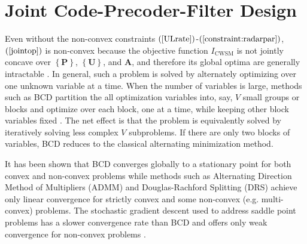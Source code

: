 \documentclass[10pt,journal]{IEEEtran}
\newcommand{\paren}[1]{\left({#1}\right)}
\newcommand{\braces}[1]{{\left\{ {#1}\right\}}}
\theoremstyle{definition}
\begin{document}
\section{Joint Code-Precoder-Filter Design}
\label{sec:solution}
Even without the non-convex constraints $\paren{\mathrm{\ref{ULrate}}}$-$\paren{\mathrm{\ref{constraint:radarpar}}}$, $\paren{\mathrm{\ref{jointop}}}$ is non-convex because the objective function $\mathit{I}_{\textrm{CWSM}}$ is not jointly concave over ${\braces{\mathbf{P}}}$, $\braces{\mathbf{U}}$, and $\mathbf{A}$, and therefore its global optima are generally intractable \cite{Lui2006subg}. In general, such a problem is solved by alternately optimizing over one unknown variable at a time. When the number of variables is large, methods such as BCD partition the all optimization variables into, say, $V$ small groups or blocks and optimize over each block, one at a time, while keeping other block variables fixed \cite{BCDconvergence}. The net effect is that the problem is equivalently solved by iteratively solving less complex $V$ subproblems. %
If there are only two blocks of variables, BCD reduces to the classical alternating minimization method\cite{BCDconvergence,Liu2017asilomar}.  %

It has been shown \cite{ADMMBCD,zhang2017convergent} that BCD converges globally to a stationary point for both convex and non-convex problems while methods such as Alternating Direction Method of Multipliers (ADMM) and Douglas-Rachford Splitting (DRS) achieve only linear convergence for strictly convex and some non-convex (e.g. multi-convex) problems. The stochastic gradient descent used to address saddle point problems has a slower convergence rate than BCD and offers only weak convergence for non-convex problems \cite{zhang2017convergent}. 

\end{document}
